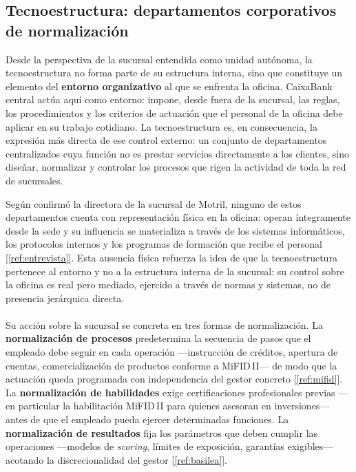 \subsection{Tecnoestructura: departamentos corporativos de normalización}

Desde la perspectiva de la sucursal entendida como unidad autónoma, la tecnoestructura
no forma parte de su estructura interna, sino que constituye un elemento del
\textbf{entorno organizativo} al que se enfrenta la oficina. CaixaBank central actúa
aquí como entorno: impone, desde fuera de la sucursal, las reglas, los procedimientos
y los criterios de actuación que el personal de la oficina debe aplicar en su trabajo
cotidiano. La tecnoestructura es, en consecuencia, la expresión más directa de ese
control externo: un conjunto de departamentos centralizados cuya función no es prestar
servicios directamente a los clientes, sino diseñar, normalizar y controlar los procesos
que rigen la actividad de toda la red de sucursales.

Según confirmó la directora de la sucursal de Motril, ninguno de estos departamentos
cuenta con representación física en la oficina: operan íntegramente desde la sede y su
influencia se materializa a través de los sistemas informáticos, los protocolos internos
y los programas de formación que recibe el personal [\ref{ref:entrevista}]. Esta
ausencia física refuerza la idea de que la tecnoestructura pertenece al entorno y no a
la estructura interna de la sucursal: su control sobre la oficina es real pero mediado,
ejercido a través de normas y sistemas, no de presencia jerárquica directa.
~\\~\\
Su acción sobre la sucursal se concreta en tres formas de normalización. La
\textbf{normalización de procesos} predetermina la secuencia de pasos que el empleado
debe seguir en cada operación ---instrucción de créditos, apertura de cuentas,
comercialización de productos conforme a MiFID\,II--- de modo que la actuación queda
programada con independencia del gestor concreto [\ref{ref:mifid}]. La
\textbf{normalización de habilidades} exige certificaciones profesionales previas ---en
particular la habilitación MiFID\,II para quienes asesoran en inversiones--- antes de
que el empleado pueda ejercer determinadas funciones. La \textbf{normalización de
resultados} fija los parámetros que deben cumplir las operaciones ---modelos de
\textit{scoring}, límites de exposición, garantías exigibles--- acotando la
discrecionalidad del gestor [\ref{ref:basilea}].

